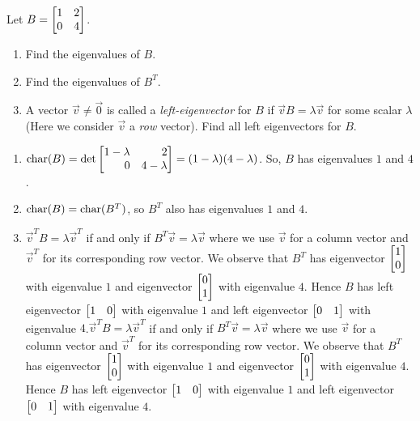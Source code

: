 \begin{exercises}
\begin{problist}
		\prob Let $B=\mat{1&2\\0&4}$.
		\begin{enumerate}
			\item Find the eigenvalues of $B$.

			\item Find the eigenvalues of $B^{T}$.

			\item A vector $\vec v\neq\vec 0$ is called a \emph{left-eigenvector}
				for $B$ if $\vec vB=\lambda \vec v$ for some scalar
				$\lambda$ (Here we consider $\vec v$ a \emph{row} vector).
				Find all left eigenvectors for $B$.
		\end{enumerate}


		\begin{solution}

			\begin{enumerate}
				\item $\Char(B) = \det\mat{1 -\lambda & 2 \\ 0 & 4 - \lambda}=
					(1 - \lambda)(4 - \lambda)$. So, $B$ has
					eigenvalues $1$ and $4$.

				\item $\operatorname{char}(B) = \operatorname{char}(B^{T})$, so $B^{T}$ also has
					eigenvalues $1$ and $4$.

				\item $\vec{v}^{T}B = \lambda \vec{v}^{T}$ if and only if $B^{T}
					\vec{v}= \lambda \vec{v}$ where we use $\vec{v}$ for
					a column vector and $\vec{v}^{T}$ for its corresponding
					row vector. We observe that $B^{T}$ has eigenvector
					$\mat{1 \\ 0}$ with eigenvalue $1$ and eigenvector
					$\mat{0\\1}$ with eigenvalue $4$. Hence $B$ has
					left eigenvector $\mat{1 & 0}$ with eigenvalue $1$
					and left eigenvector $\mat{0 & 1}$ with eigenvalue
					$4$.$\vec{v}^{T}B = \lambda \vec{v}^{T}$ if and
					only if $B^{T} \vec{v}= \lambda \vec{v}$ where we
					use $\vec{v}$ for a column vector and
					$\vec{v}^{T}$ for its corresponding row vector. We
					observe that $B^{T}$ has eigenvector
					$\mat{1 \\ 0}$ with eigenvalue $1$ and eigenvector
					$\mat{0\\1}$ with eigenvalue $4$. Hence $B$ has left
					eigenvector $\mat{1 & 0}$ with eigenvalue $1$ and left
					eigenvector $\mat{0 & 1}$ with eigenvalue $4$.
			\end{enumerate}
		\end{solution}


\end{problist}
\end{exercises}
